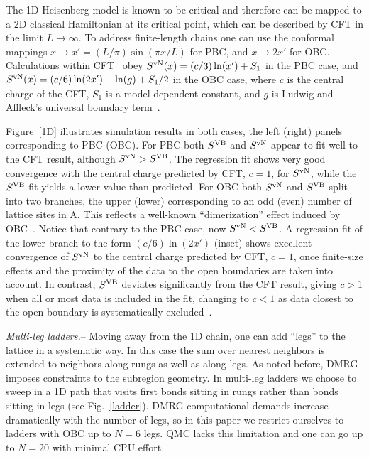\documentclass[prl,aps,twocolumn,floatfix,amsmath,amssymb,superscriptaddress,tightenlines]{revtex4}
\begin{document}
The 1D Heisenberg model is known to be critical and therefore can be
mapped to a 2D classical Hamiltonian at its critical point, which
can be described by CFT in the limit $L\to\infty$.  To address
finite-length chains one can use the conformal mappings $x\to x'=(L/\pi)
\sin(\pi x / L)$ for PBC, and 
$x\to 2x'$ for OBC. %
Calculations within CFT~\cite{Cardy} obey $S^{\rm vN}(x)= (c/3)
\ln(x') + S_1$ in the PBC case, and $S^{\rm vN}(x)= (c/6) \ln(2x') +
\ln(g)+S_1/2$ in the OBC case, where $c$ is the central charge of the CFT,
$S_1$ is a model-dependent constant, and $g$ is Ludwig and Affleck's
universal boundary term~\cite{AffleckAndLudwig}.

Figure~\ref{1D} illustrates simulation results in both cases, the left
(right) panels corresponding to PBC (OBC). 
For PBC both
$S^{\rm VB}$ and $S^{ \rm vN}$ appear to fit well to the CFT result, although
$S^{ \rm vN} > S^{\rm VB}$. The regression fit shows very good
convergence with the central charge predicted by CFT, $c=1$, for $S^{ \rm vN}$, while
the $S^{\rm VB}$ fit yields a lower value than predicted.
For OBC both $S^{ \rm vN}$ and $S^{\rm VB}$ split into two branches, the upper (lower)
corresponding to an odd (even) number of lattice sites in A.  This
reflects a well-known ``dimerization'' effect induced by OBC~\cite{Ian1}.
Notice that contrary to the PBC case, now $S^{ \rm vN} < S^{\rm VB}$. 
A regression fit of the lower branch to the form $(c/6) \ln
({2x'})$ (inset) shows excellent convergence of $S^{ \rm vN}$ to the central
charge predicted by CFT, $c=1$, once finite-size effects and the proximity
of the data to the open boundaries are taken into account.  In contrast,
 $S^{\rm VB}$ deviates significantly from the CFT result, giving 
$c>1$ when all or most data is included in the fit, changing to $c<1$
as data closest to the open boundary is systematically excluded~\cite{XXX}.

{\it Multi-leg ladders.}-- Moving away from the 1D chain, one can add
``legs'' to the lattice in a systematic way. In this case the sum over
nearest neighbors is extended to neighbors along rungs as well as along
legs.  As noted before, DMRG imposes constraints to the subregion
geometry. In multi-leg ladders we choose to sweep in a 1D path that visits
first bonds sitting in rungs rather than bonds sitting in legs (see
Fig.~\ref{ladder}).  DMRG computational demands increase dramatically with
the number of legs, so in this paper we restrict ourselves to ladders with
OBC up to $N=6$ legs. QMC lacks this limitation and one can go up to
$N=20$ with minimal CPU effort.
\end{document}
